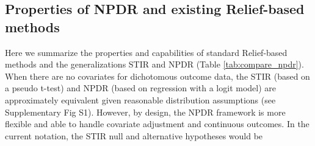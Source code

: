 \documentclass[10pt]{article}
\begin{document}
% 

\subsection{Properties of NPDR and existing Relief-based methods}
Here we summarize the properties and capabilities of standard Relief-based methods and the generalizations STIR and NPDR (Table \ref{tab:compare_npdr}).
When there are no covariates for dichotomous outcome data, the STIR (based on a pseudo t-test) and NPDR (based on regression with a logit model) are approximately equivalent given reasonable distribution assumptions (see Supplementary Fig S1).
However, by design, the NPDR framework is more flexible and able to handle covariate adjustment and continuous outcomes.
In the current notation, the STIR null and alternative hypotheses would be
\end{document}
